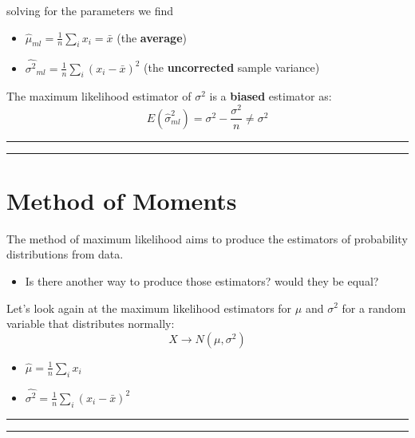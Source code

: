 \documentclass[
]{book}
\providecommand{\tightlist}{%
  \setlength{\itemsep}{0pt}\setlength{\parskip}{0pt}}
\begin{document}
solving for the parameters we find

\begin{itemize}
\tightlist
\item
  \(\hat{\mu}_{ml}=\frac{1}{n}\sum_i x_i=\bar{x}\) (the \textbf{average})
\item
  \(\hat{\sigma^2}_{ml}=\frac{1}{n}\sum_i(x_i-\bar{x})^2\) (the \textbf{uncorrected} sample variance)
\end{itemize}

The maximum likelihood estimator of \(\sigma^2\) is a \textbf{biased} estimator as: \[E(\hat{\sigma}^2_{ml})=\sigma^2-\frac{\sigma^2}{n}\neq \sigma^2\]

\begin{center}\rule{0.5\linewidth}{0.5pt}\end{center}

\begin{center}\rule{0.5\linewidth}{0.5pt}\end{center}

\hypertarget{method-of-moments}{%
\section{Method of Moments}\label{method-of-moments}}

The method of maximum likelihood aims to produce the estimators of probability distributions from data.

\begin{itemize}
\tightlist
\item
  Is there another way to produce those estimators? would they be equal?
\end{itemize}

Let's look again at the maximum likelihood estimators for \(\mu\) and \(\sigma^2\) for a random variable that distributes normally: \[X \rightarrow N(\mu, \sigma^2)\]

\begin{itemize}
\tightlist
\item
  \(\hat{\mu}=\frac{1}{n}\sum_i x_i\)
\item
  \(\hat{\sigma^2}=\frac{1}{n}\sum_i(x_i-\bar{x})^2\)
\end{itemize}

\begin{center}\rule{0.5\linewidth}{0.5pt}\end{center}

\begin{center}\rule{0.5\linewidth}{0.5pt}\end{center}
\end{document}
